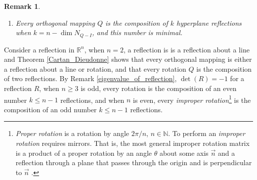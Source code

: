 \documentclass[10pt]{book}
\newtheorem{remark}{Remark}[chapter]
\theoremstyle{definition}
\numberwithin{equation}{chapter}
\begin{document}
\begin{subappendices}
\begin{remark}
\begin{enumerate}[label=(\alph*)]
    If $1$ is not an  eigenvalue of $R$, then $R$ is the composition of $k \leq n$ reflections about hyperplanes $H, F_1, \cdots, F_{k-1}$, such that $F_i = H \oplus L$, where $L$ is a line intersecting $H$ and  $H_i$ are subspaces of dimension $n - 2$ that are orthogonal to $L$. 
    
    \item Every orthogonal mapping $Q$ is the composition of $k$ hyperplane reflections when $k = n - \dim N_{Q-I}$, and this number is minimal. 
\end{enumerate}
\end{remark}

\medskip

Consider a reflection in $\mathbb{R}^n$, when $n = 2$, a reflection is is a reflection about a line and Theorem \ref{Cartan_Dieudonne} shows that every orthogonal mapping is either a reflection about a line or rotation, and that every rotation $Q$ is the composition of two reflections. By Remark \ref{eigenvalue_of_reflection}, $\det (R) = -1$ for a reflection $R$, when $n \geq 3$ is odd, every rotation is the composition of an even number $k \leq n - 1$ reflections, and when $n$ is even, every {\em improper rotation}\footnote{{\em Proper rotation} is a rotation by angle $2\pi/n$, $n \in \mathbb{N}$. To perform an {\em improper rotation} requires mirrors. That is, the most general improper rotation matrix is a product of a proper rotation by an angle $\theta$ about some axis $\vec{n}$ and a reflection through a plane that passes through the origin and is perpendicular to $\vec{n}$ \cite{36}.} is the composition of an odd number $k \leq n - 1$ reflections.


\end{subappendices}
\end{document}
